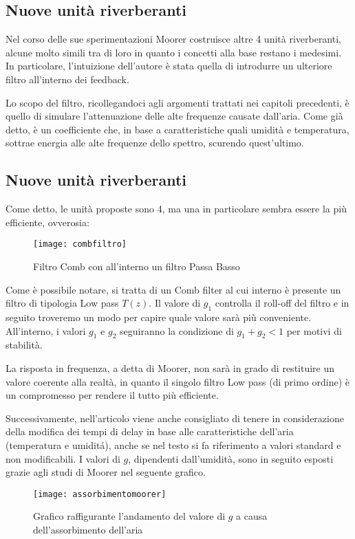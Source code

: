 \subsection{Nuove unità riverberanti}

Nel corso delle sue sperimentazioni Moorer costruisce altre 4 unità riverberanti, alcune molto simili tra di loro in quanto i concetti alla base restano i medesimi. In particolare, l’intuizione dell’autore è stata quella di introdurre un ulteriore filtro all’interno dei feedback.

Lo scopo del filtro, ricollegandoci agli argomenti trattati nei capitoli precedenti, è quello di simulare l’attenuazione delle alte frequenze causate dall’aria. Come già detto, è un coefficiente che, in base a caratteristiche quali umidità e temperatura, sottrae energia alle alte frequenze dello spettro, scurendo quest’ultimo.

\subsection{Nuove unità riverberanti}

Come detto, le unità proposte sono 4, ma una in particolare sembra essere la più efficiente, ovverosia:

\begin{figure}[htp]
\centering
\texttt{[image: combfiltro]}
\caption{Filtro Comb con all'interno un filtro Passa Basso}
\label{fig:combfiltro}
\end{figure}

Come è possibile notare, si tratta di un Comb filter al cui interno è presente un filtro di tipologia Low pass $T(z)$. Il valore di $g_1$ controlla il roll-off del filtro e in seguito troveremo un modo per capire quale valore sarà più conveniente.
All’interno, i valori $g_1$ e $g_2$ seguiranno la condizione di $g_1+g_2<1$ per motivi di stabilità.

La risposta in frequenza, a detta di Moorer,  non sarà in grado di restituire un valore coerente alla realtà, in quanto il singolo filtro Low pass (di primo ordine) è un compromesso per rendere il tutto più efficiente.

Successivamente, nell’articolo viene anche consigliato di tenere in considerazione della modifica dei tempi di delay in base alle caratteristiche dell’aria (temperatura e umiditá), anche se nel testo si fa riferimento a valori standard e non modificabili.
I valori di $g$, dipendenti dall’umidità, sono in seguito esposti grazie agli studi di Moorer nel seguente grafico.
\begin{figure}[h!]
\centering
\texttt{[image: assorbimentomoorer]}
\caption{Grafico raffigurante l'andamento del valore di $g$ a causa dell'assorbimento dell'aria}
\label{fig:assorbimentomoorer}
\end{figure}
\bigskip
